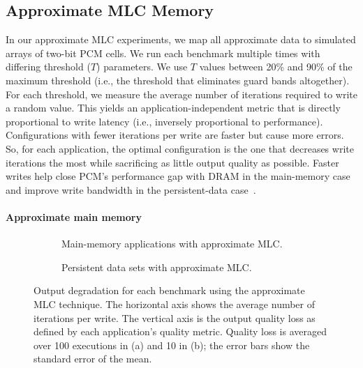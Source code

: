 \subsection{Approximate MLC Memory}

In our approximate MLC experiments, we map all approximate data to simulated
arrays of two-bit PCM cells. We run each benchmark multiple times with
differing threshold ($T$) parameters. We use $T$ values between 20\%
and 90\% of the maximum threshold (i.e., the threshold that eliminates
guard bands altogether).
For each threshold, we measure the
average number of iterations required to write a random value.
This yields an application-independent metric that is
directly proportional to write latency (i.e., inversely
proportional to performance). Configurations with fewer iterations per write
are faster but cause more errors. So, for each application, the optimal
configuration is the one that decreases write iterations the most while
sacrificing as little output quality as possible.
Faster writes help close PCM's performance gap with DRAM in the main-memory
case and improve write bandwidth in the persistent-data
case~\cite{pcm-dram-alt,flash-retention-relax}.

\paragraph{Approximate main memory}

\begin{figure}
    \begin{subfigure}[b]{0.5\columnwidth}
        \centering
        
        \caption{
            Main-memory applications with approximate MLC.
        }
        \label{approxstorage:fig:qos-mlc}
    \end{subfigure}
    \begin{subfigure}[b]{0.5\columnwidth}
        \centering
        
        \caption{
            Persistent data sets with approximate MLC.
        }
        \label{approxstorage:fig:nv-qos-mlc}
    \end{subfigure}
    \caption{
        Output degradation for each benchmark using the approximate
        MLC technique.
        The horizontal
        axis shows the average number of iterations per write.
        The vertical axis is the output quality loss as
        defined by each application's quality metric.
        Quality loss is averaged over 100 executions in (a) and 10 in (b); the
        error bars show the standard error of the mean.
    }
\end{figure}

